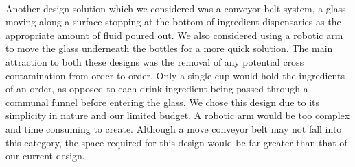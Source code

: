 \documentclass[12pt, titlepage]{article}
\begin{document}
\\
Another design solution which we considered was a conveyor belt system, a glass moving along a surface stopping at the bottom of ingredient dispensaries as the appropriate amount of fluid poured out. We also considered using a robotic arm to move the glass underneath the bottles for a more quick solution. The main attraction to both these designs was the removal of any potential cross contamination from order to order. Only a single cup would hold the ingredients of an order, as opposed to each drink ingredient being passed through a communal funnel before entering the glass. We chose this design due to its simplicity in nature and our limited budget. A robotic arm would be too complex and time consuming to create. Although a move conveyor belt may not fall into this category, the space required for this design would be far greater than that of our current design. 
\end{document}
